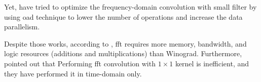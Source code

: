 Yet, \textcite{zeng_optimizing_nodate, chitsaz_acceleration_2020, liang_evaluating_2020} have tried to optimize the frequency-domain convolution with small filter by using \acrfull{oad} technique \cite{w_smith_scientist_1997} to lower the number of operations and increase the data parallelism.

Despite those works, according to \textcite{liang_evaluating_2020, podili_fast_2017}, \acrshort{fft} requires more memory, bandwidth, and logic resources (additions and multiplications) than Winograd. Furthermore, \textcite{zhang_caffeine_2016} pointed out that Performing \acrshort{fft} convolution with $1 \times 1$ kernel is inefficient, and they have performed it in time-domain only.
